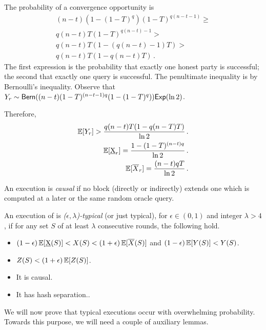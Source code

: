 The probability of a convergence opportunity is
\begin{align*}
  (n - t) (1 - (1 - T)^q) (1 - T)^{q(n - t - 1)} \geq \\
  q(n - t) T (1 - T)^{q(n - t) - 1} > \\
  q(n - t) T (1 - (q(n - t) - 1)T) > \\
  q(n - t) T (1 - q(n - t)T)\,.
\end{align*}
The first expression is the probability that exactly one honest party is successful;
the second that exactly one query is successful. The penultimate inequality is by
Bernoulli's inequality.
Observe that $Y_r \sim \textsf{Bern}((n - t)(1 - T)^{(n - t - 1)q}(1 - (1 - T)^q)) \textsf{Exp}(\ln 2)$.

Therefore,
\begin{align*}
  \mathop{{}\mathbb{E}}[Y_r] > \frac{q(n - t)T(1 - q(n - T)T)}{\ln2}\,.\\
  \mathop{{}\mathbb{E}}[\underbar{X}_r] = \frac{1 - (1 - T)^{(n - t)q}}{\ln2}\,.\\
  \mathop{{}\mathbb{E}}[\overline{X}_r] = \frac{(n - t)qT}{\ln2}\,.
\end{align*}

\begin{definition}[Causality]
  An execution is \emph{causal} if no block (directly or indirectly) extends
  one which is computed at a later or the same random oracle query.
\end{definition}

\begin{definition}
  An execution of \poem is \emph{($\epsilon,\lambda$)-typical} (or just typical),
  for $\epsilon \in (0,1)$ and integer $\lambda > 4$, if for any set $S$ of at
  least $\lambda$ consecutive rounds, the following hold.
  \begin{itemize}
    \item $(1 - \epsilon) \mathop{{}\mathbb{E}}[\underbar{X}(S)] < X(S) < (1 + \epsilon) \mathop{{}\mathbb{E}}[\overline{X}(S)]$ and $(1-\epsilon) \mathop{{}\mathbb{E}}[Y(S)] < Y(S)$.\label{item:typicality-x-y}
    \item $Z(S) < (1 + \epsilon)\mathop{{}\mathbb{E}}[Z(S)]$.\label{item:typicality-z}
    \item It is causal.\label{item:typicality-causal}
    \item It has hash separation..\label{item:typicality-hash-separation}
  \end{itemize}
\end{definition}

We will now prove that typical executions occur with overwhelming probability.
Towards this purpose, we will need a couple of auxiliary lemmas.

